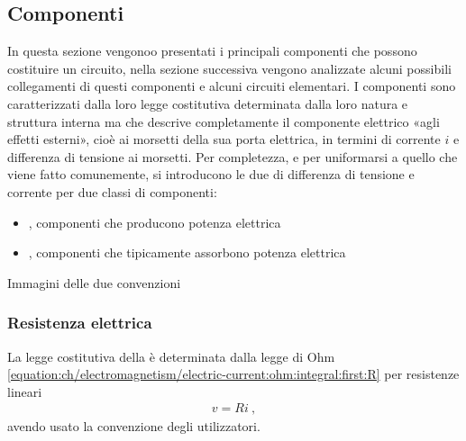 \documentclass[letterpaper,10pt,italian]{jupyterBook}
\begin{document}
\subsection{Componenti}
\label{\detokenize{ch/electromagnetism/circuits-electric:componenti}}\label{\detokenize{ch/electromagnetism/circuits-electric:physics-hs-electromagnetism-circuits-electric-components}}
\sphinxAtStartPar
In questa sezione vengonoo presentati i principali componenti che possono costituire un circuito, nella sezione successiva vengono analizzate alcuni possibili collegamenti di questi componenti e alcuni circuiti elementari.
I componenti sono caratterizzati dalla loro legge costitutiva \sphinxhyphen{} determinata dalla loro natura e struttura interna \sphinxhyphen{} ma che descrive completamente il componente elettrico «agli effetti esterni», cioè ai morsetti della sua porta elettrica, in termini di corrente \(i\) e differenza di tensione ai morsetti. Per completezza, e per uniformarsi a quello che viene fatto comunemente, si introducono le due  di differenza di tensione e corrente per due classi di componenti:
\begin{itemize}
\item {} 
\sphinxAtStartPar
{}, componenti che producono potenza elettrica

\item {} 
\sphinxAtStartPar
{}, componenti che \sphinxhyphen{} tipicamente \sphinxhyphen{} assorbono potenza elettrica

\end{itemize}

\sphinxAtStartPar
{} Immagini delle due convenzioni


\subsubsection{Resistenza elettrica}
\label{\detokenize{ch/electromagnetism/circuits-electric:resistenza-elettrica}}\label{\detokenize{ch/electromagnetism/circuits-electric:physics-hs-electromagnetism-circuits-electric-components-resistor}}
\sphinxAtStartPar
La legge costitutiva della {\hyperref[\detokenize{ch/electromagnetism/electric-current:physics-hs-electromagnetism-electric-current-solids-conductor-ohm}]{}} è determinata dalla legge di Ohm \eqref{equation:ch/electromagnetism/electric-current:ohm:integral:first:R} per resistenze lineari
\begin{equation*}
\begin{split}v = R i \ ,\end{split}
\end{equation*}
\sphinxAtStartPar
avendo usato la convenzione degli utilizzatori.
\end{document}
